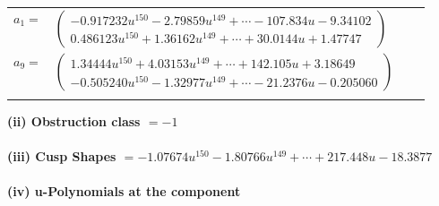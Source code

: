 \documentclass[1p]{elsarticle_modified}
\theoremstyle{definition}
\begin{document}
\begin{tabular}{m{7pt} m{180pt} m{7pt} m{180pt} }
\flushright $a_{1}=$&$\begin{pmatrix}-0.917232 u^{150}-2.79859 u^{149}+\cdots-107.834 u-9.34102\\0.486123 u^{150}+1.36162 u^{149}+\cdots+30.0144 u+1.47747\end{pmatrix}$ \\
\flushright $a_{9}=$&$\begin{pmatrix}1.34444 u^{150}+4.03153 u^{149}+\cdots+142.105 u+3.18649\\-0.505240 u^{150}-1.32977 u^{149}+\cdots-21.2376 u-0.205060\end{pmatrix}$\\&\end{tabular}
\flushleft \textbf{(ii) Obstruction class $= -1$}\\~\\
\flushleft \textbf{(iii) Cusp Shapes $= -1.07674 u^{150}-1.80766 u^{149}+\cdots+217.448 u-18.3877$}\\~\\
\newpage\renewcommand{\arraystretch}{1}
\flushleft \textbf{(iv) u-Polynomials at the component}\newline \\
\end{document}
